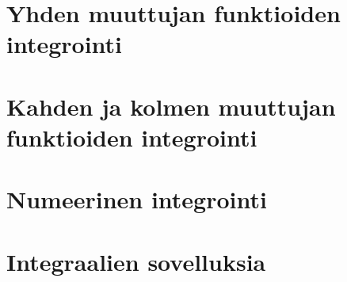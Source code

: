 \documentclass{article}%
\numberwithin{equation}{section}
\numberwithin{figure}{section}
\numberwithin{table}{section}
\begin{document}


\pagebreak

\section{Yhden muuttujan funktioiden integrointi}



\pagebreak

\section{Kahden ja kolmen muuttujan funktioiden integrointi}



\pagebreak

\section{Numeerinen integrointi}



\pagebreak

\section{Integraalien sovelluksia}



\pagebreak











%
\end{document}
